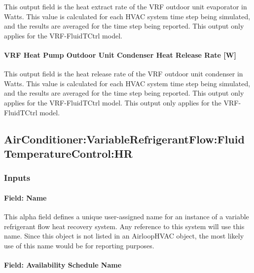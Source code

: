 This output field is the heat extract rate of the VRF outdoor unit evaporator in Watts. This value is calculated for each HVAC system time step being simulated, and the results are averaged for the time step being reported. This output only applies for the VRF-FluidTCtrl model.

\paragraph{VRF Heat Pump Outdoor Unit Condenser Heat Release Rate {[}W{]}}\label{vrf-heat-pump-outdoor-unit-condenser-heat-release-rate}

This output field is the heat release rate of the VRF outdoor unit condenser in Watts. This value is calculated for each HVAC system time step being simulated, and the results are averaged for the time step being reported. This output only applies for the VRF-FluidTCtrl model. This output only applies for the VRF-FluidTCtrl model.



\subsection{AirConditioner:VariableRefrigerantFlow:FluidTemperatureControl:HR}\label{airconditionervariablerefrigerantflowfluidtemperaturecontrolhr}

\subsubsection{Inputs}

\paragraph{Field: Name}

This alpha field defines a unique user-assigned name for an instance of a variable refrigerant flow heat recovery system. Any reference to this system will use this name. Since this object is not listed in an AirloopHVAC object, the most likely use of this name would be for reporting purposes.

\paragraph{Field: Availability Schedule Name}

